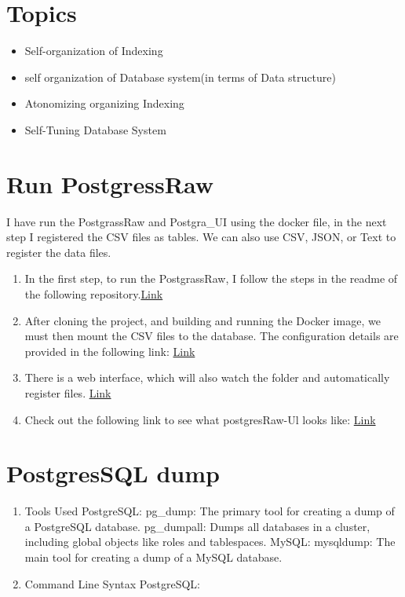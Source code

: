 \documentclass[sigconf,natbib=false]{acmart}
\begin{document}
\begin{draft}
\section{Topics}

    \begin{itemize}
        \item Self-organization of Indexing
           \item self organization of Database system(in terms of Data structure)
              \item Atonomizing organizing Indexing
                 \item Self-Tuning Database System
    \end{itemize}
    
\section{Run PostgressRaw}
I have run the PostgrassRaw and Postgra\_UI using the docker file, in the next step I registered the CSV files as tables. We can also use CSV, JSON, or Text to register the data files.
\begin{enumerate}
    \item In the first step, to run the PostgrassRaw, I follow the steps in the readme of the following repository.\href{https://github.com/HBPMedical/PostgresRAW-docker}{Link}

\item After cloning the project, and building and running the Docker image, we must then mount the CSV files to the database. The configuration details are provided in the following link:
 \href{https://github.com/HBPMedical/PostgresRAW?tab=readme-ov-file#configuring-postgresraw}{Link}

\item There is a web interface, which will also watch the folder and automatically register files.
\href{https://github.com/HBPMedical/PostgresRAW-UI-docker}{Link}

\item Check out the following link to see what postgresRaw-Ul looks like:
\href{https://docs.google.com/presentation/d/1KapOfryxOoCNvYPEL46gakVLlgRQWa35plUXsbrLkwA/edit?usp=sharing}{Link}
\end{enumerate}

\section{PostgresSQL dump}
\begin{enumerate}
 \item  Tools Used
    PostgreSQL:
        pg_dump: The primary tool for creating a dump of a PostgreSQL database.
        pg_dumpall: Dumps all databases in a cluster, including global objects like roles and tablespaces.
    MySQL:
        mysqldump: The main tool for creating a dump of a MySQL database.
 \item Command Line Syntax PostgreSQL:


\end{enumerate}
\end{draft}
\end{document}
